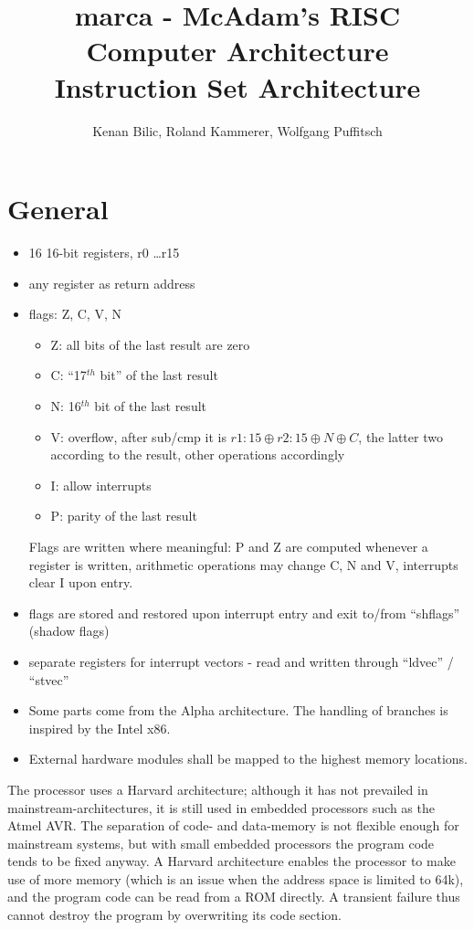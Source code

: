\documentclass[10pt, twoside, a4paper]{article}
\title{marca - McAdam's RISC Computer Architecture\\Instruction Set Architecture}
\author{Kenan Bilic, Roland Kammerer, Wolfgang Puffitsch}
\newcommand{\at}{\ensuremath{\!\!:\!\!}}
\begin{document}
  \maketitle

  \section{General}

  \begin{itemize}
  \item 16 16-bit registers, r0 \ldots r15
  \item any register as return address
  \item flags: Z, C, V, N
    \begin{itemize}
    \item Z: all bits of the last result are zero
    \item C: ``17$^{th}$ bit'' of the last result
    \item N: 16$^{th}$ bit of the last result
    \item V: overflow, after sub/cmp it is $r1 \at 15 \oplus r2 \at 15
      \oplus N \oplus C$, the latter two according to the result,
      other operations accordingly
    \item I: allow interrupts
    \item P: parity of the last result
    \end{itemize}
    Flags are written where meaningful: P and Z are computed whenever
    a register is written, arithmetic operations may change C, N and
    V, interrupts clear I upon entry.
  \item flags are stored and restored upon interrupt entry and exit
    to/from ``shflags'' (shadow flags)
  \item separate registers for interrupt vectors - read and written
    through ``ldvec'' / ``stvec''
  \item Some parts come from the Alpha architecture. The handling of
    branches is inspired by the Intel x86.
  \item External hardware modules shall be mapped to the highest
    memory locations.
  \end{itemize}

  The processor uses a Harvard architecture; although it has not
  prevailed in mainstream-architectures, it is still used in embedded
  processors such as the Atmel AVR. The separation of code- and
  data-memory is not flexible enough for mainstream systems, but with
  small embedded processors the program code tends to be fixed
  anyway. A Harvard architecture enables the processor to make use of
  more memory (which is an issue when the address space is limited to
  64k), and the program code can be read from a ROM directly. A
  transient failure thus cannot destroy the program by overwriting its
  code section.
\end{document}
